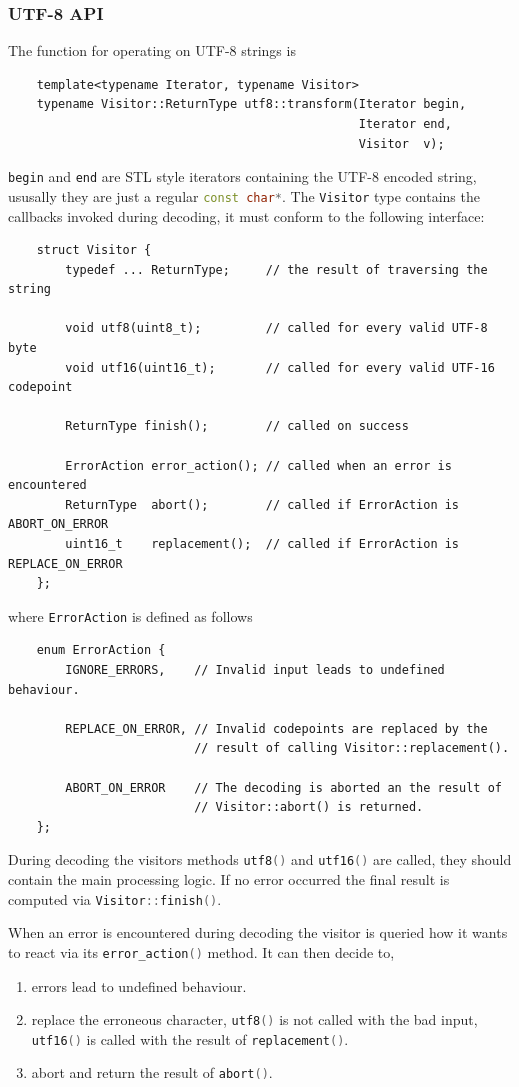 \documentclass[12pt,a4paper,oneside]{article}
\newcommand{\cpp}[1]{\lstinline[language=C++]{#1}}
\begin{document}
\clearpage
\subsubsection{UTF-8 API}
	The function for operating on UTF-8 strings is
		\begin{lstlisting}
	template<typename Iterator, typename Visitor>
	typename Visitor::ReturnType utf8::transform(Iterator begin,
	                                             Iterator end, 
	                                             Visitor  v);
		\end{lstlisting}

	\cpp{begin} and \cpp{end} are STL style iterators containing the UTF-8 encoded string,
	ususally they are just a regular \cpp{const char*}.
	The \cpp{Visitor} type contains the callbacks invoked during decoding, it must conform to the following interface:
		\begin{lstlisting}
	struct Visitor {
		typedef ... ReturnType;     // the result of traversing the string

		void utf8(uint8_t);         // called for every valid UTF-8 byte
		void utf16(uint16_t);       // called for every valid UTF-16 codepoint

		ReturnType finish();        // called on success

		ErrorAction error_action(); // called when an error is encountered
		ReturnType  abort();        // called if ErrorAction is ABORT_ON_ERROR
		uint16_t    replacement();  // called if ErrorAction is REPLACE_ON_ERROR
	};
		\end{lstlisting}
	\vspace*{5pt}
	where \cpp{ErrorAction} is defined as follows
		\begin{lstlisting}
	enum ErrorAction {
		IGNORE_ERRORS,    // Invalid input leads to undefined behaviour.

		REPLACE_ON_ERROR, // Invalid codepoints are replaced by the
		                  // result of calling Visitor::replacement().

		ABORT_ON_ERROR    // The decoding is aborted an the result of
		                  // Visitor::abort() is returned.
	};
		\end{lstlisting}

	During decoding the visitors methods \cpp{utf8()} and \cpp{utf16()} are called,
	they should contain the main processing logic.
	If no error occurred the final result is computed via \cpp{Visitor::finish()}.

	When an error is encountered during decoding the visitor is queried how it wants to react 
	via its \cpp{error_action()} method.
	It can then decide to,
	\begin{enumerate}[label=\alph*)]
		\item errors lead to undefined behaviour.
		\item replace the erroneous character, \cpp{utf8()} is not called with the bad input, \cpp{utf16()} is called
		          with the result of \cpp{replacement()}.
		\item abort and return the result of \cpp{abort()}.
	\end{enumerate}
\end{document}
